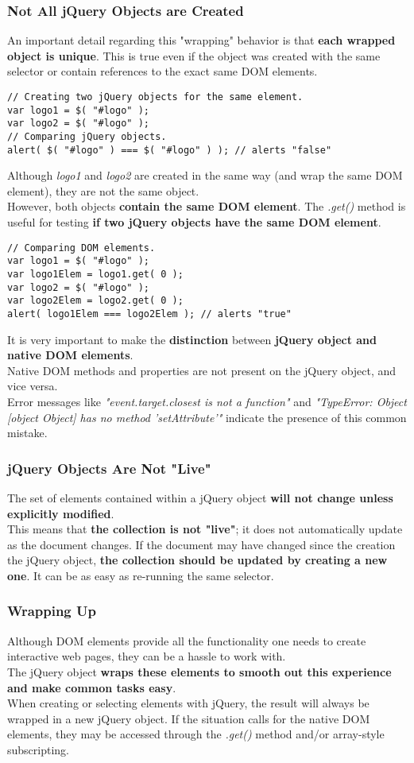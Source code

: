 \documentclass[10pt,letterpaper]{book}
\begin{document}
\subsubsection{Not All jQuery Objects are Created}
An important detail regarding this "wrapping" behavior is that \textbf{each wrapped object is unique}. This is true even if the object was created with the same selector or contain references to the exact same DOM elements.
\begin{lstlisting}
// Creating two jQuery objects for the same element.
var logo1 = $( "#logo" );
var logo2 = $( "#logo" );
// Comparing jQuery objects.
alert( $( "#logo" ) === $( "#logo" ) ); // alerts "false"
\end{lstlisting}
Although \textit{logo1} and \textit{logo2} are created in the same way (and wrap the same DOM element), they are not the same object.\\
However, both objects \textbf{contain the same DOM element}. The \textit{.get()} method is useful for testing \textbf{if two jQuery objects have the same DOM element}.
\begin{lstlisting}
// Comparing DOM elements.
var logo1 = $( "#logo" );
var logo1Elem = logo1.get( 0 );
var logo2 = $( "#logo" );
var logo2Elem = logo2.get( 0 );
alert( logo1Elem === logo2Elem ); // alerts "true"
\end{lstlisting}
It is very important to make the \textbf{distinction} between \textbf{jQuery object and native DOM elements}.\\
Native DOM methods and properties are not present on the jQuery object, and vice versa.\\
Error messages like \textit{"event.target.closest is not a function"} and \textit{"TypeError: Object [object Object] has no method 'setAttribute'"} indicate the presence of this common mistake.
\subsubsection{jQuery Objects Are Not "Live"}
The set of elements contained within a jQuery object \textbf{will not change unless explicitly modified}.\\
This means that \textbf{the collection is not "live"}; it does not automatically update as the document changes. If the document may have changed since the creation the jQuery object, \textbf{the collection should be updated by creating a new one}. It can be as easy as re-running the same selector.
\subsubsection{Wrapping Up}
Although DOM elements provide all the functionality one needs to create interactive web pages, they can be a hassle to work with.\\
The jQuery object \textbf{wraps these elements to smooth out this experience and make common tasks easy}.\\
When creating or selecting elements with jQuery, the result will always be wrapped in a new jQuery object. If the situation calls for the native DOM elements, they may be accessed through the \textit{.get()} method and/or array-style subscripting.
\end{document}
